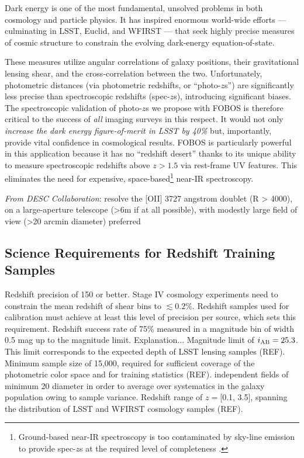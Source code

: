 \documentclass[11pt,a4paper,twoside,onecolumn,openany,final,oldfontcommands]{memoir}
\begin{document}
Dark energy is one of the most fundamental, unsolved problems in both cosmology and particle physics.  It has inspired enormous world-wide efforts --- culminating in LSST, Euclid, and WFIRST --- that seek highly precise measures of cosmic structure to constrain the evolving dark-energy equation-of-state.

These measures utilize angular correlations of galaxy positions, their gravitational lensing shear, and the cross-correlation between the two. Unfortunately, photometric distances (via photometric redshifts, or ``photo-$z$s'') are significantly less precise than spectroscopic redshifts (spec-$z$s), introducing significant biases.  The spectroscopic validation of photo-$z$s we propose with FOBOS is therefore critical to the success of {\it all} imaging surveys in this respect. It would not only \emph{increase the dark energy figure-of-merit in LSST by 40\%} \citep{newman15} but, importantly, provide vital confidence in cosmological results.  FOBOS is particularly powerful in this application because it has no ``redshift desert'' thanks to its unique ability to measure spectroscopic redshifts above $z > 1.5$ via rest-frame UV features.  This eliminates the need for expensive, space-based\footnote{Ground-based near-IR spectroscopy is too contaminated by sky-line emission to provide spec-$z$s at the required level of completeness \citep{newman15}.} near-IR spectroscopy. 

\emph{From DESC Collaboration}: resolve the [OII] 3727 angstrom doublet (R > 4000), on a large-aperture telescope (>6m if at all possible), with modestly large field of view (>20 arcmin diameter) preferred


\subsection{Science Requirements for Redshift Training Samples}

\begin{sciencerequirement}
\reqitem Redshift precision of 150 \kms{} or better. Stage IV cosmology experiments need to constrain the mean redshift of shear bins to $\lesssim0.2\%$. Redshift samples used for calibration must achieve at least this level of precision per source, which sets this requirement. 
%
\reqitem Redshift success rate of 75\% measured in a magnitude bin of width 0.5 mag up to the magnitude limit.  Explanation...
%
\reqitem Magnitude limit of $i_{\rm AB} = 25.3$.  This limit corresponds to the expected depth of LSST lensing samples (REF).
%
\reqitem Minimum sample size of 15,000, required for sufficient coverage of the photometric color space and for training statistics (REF).
%
 independent fields of minimum 20\arcmin{} diameter in order to average over systematics in the galaxy population owing to sample variance.
%
\reqitem Redshift range of $z = $[0.1, 3.5], spanning the distribution of LSST and WFIRST cosmology samples (REF).
%
\end{sciencerequirement}
\end{document}
